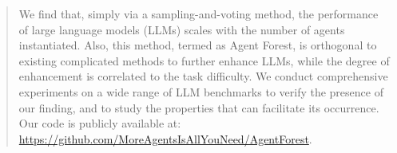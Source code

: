 \begin{abstract}
We find that, simply via a sampling-and-voting method, the performance of large language models (LLMs) scales with the number of agents instantiated. Also, this method, termed as Agent Forest, is orthogonal to existing complicated methods to further enhance LLMs, while the degree of enhancement is correlated to the task difficulty. We conduct comprehensive experiments on a wide range of LLM benchmarks to verify the presence of our finding, and to study the properties that can facilitate its occurrence. Our code is publicly available at: \href{https://github.com/MoreAgentsIsAllYouNeed/AgentForest}{https://github.com/MoreAgentsIsAllYouNeed/AgentForest}.
\end{abstract}